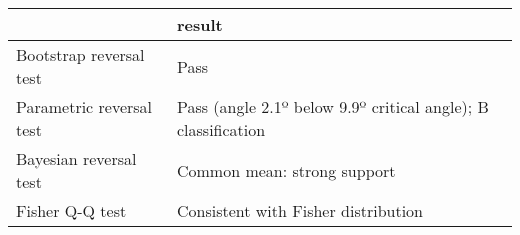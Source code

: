 \begin{tabular}{ll}
\toprule
{} &                                                         result \\
\midrule
Bootstrap reversal test  &                                                           Pass \\
Parametric reversal test &  Pass (angle 2.1º below 9.9º critical angle); B classification \\
Bayesian reversal test   &                                    Common mean: strong support \\
Fisher Q-Q test          &                            Consistent with Fisher distribution \\
\bottomrule
\end{tabular}
